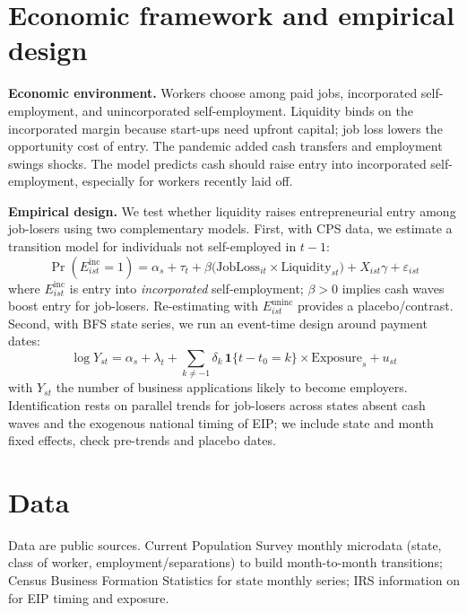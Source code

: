 \section{ Economic framework and empirical design}

\noindent \textbf{Economic environment.} Workers choose among paid jobs, incorporated self-employment, and unincorporated self-employment. Liquidity binds on the incorporated margin because start-ups need upfront capital; job loss lowers the opportunity cost of entry. The pandemic added cash transfers and employment swings shocks. The model predicts cash should raise entry into incorporated self-employment, especially for workers recently laid off.


\noindent\textbf{Empirical design.} We test whether liquidity raises entrepreneurial entry among job-losers using two complementary models. First, with CPS data, we estimate a transition model for individuals not self-employed in $t\!-\!1$:
\begin{equation*}
	\Pr(E^{\mathrm{inc}}_{ist}=1)=\alpha_s+\tau_t+\beta\big(\text{JobLoss}_{it}\times \text{Liquidity}_{st}\big)+X_{ist}\gamma+\varepsilon_{ist}
\end{equation*}
where $E^{\mathrm{inc}}_{ist}$ is entry into \emph{incorporated} self-employment; $\beta>0$ implies cash waves boost entry for job-losers. Re-estimating with $E^{\mathrm{uninc}}_{ist}$ provides a placebo/contrast. Second, with BFS state series, we run an event-time design around payment dates:
\begin{equation*}
	\log Y_{st}=\alpha_s+\lambda_t+\sum_{k\neq -1}\delta_k\,\mathbf{1}\{t-t_0=k\}\times \text{Exposure}_s+u_{st}
\end{equation*}
with $Y_{st}$ the number of business applications likely to become employers. Identification rests on parallel trends for job-losers across states absent cash waves and the exogenous national timing of EIP; we include state and month fixed effects, check pre-trends and placebo dates.

\section{ Data}

\noindent Data are public sources. Current Population Survey monthly microdata (state, class of worker, employment/separations) to build month-to-month transitions; Census Business Formation Statistics for state monthly series; IRS information on for EIP timing and exposure.



\singlespacing



\pagebreak
\renewcommand*{\thepage}{A.\arabic{page}}
\setcounter{page}{0}
\setcounter{equation}{0}
\renewcommand{\theequation}{A.\arabic{equation}}
\setcounter{section}{0}
\renewcommand{\thesection}{A.\arabic{section}}
\renewcommand{\thefigure}{A.\arabic{figure}}
\setcounter{figure}{0}
\renewcommand{\thetable}{A.\arabic{table}}
\setcounter{table}{0}
\thispagestyle{empty}


